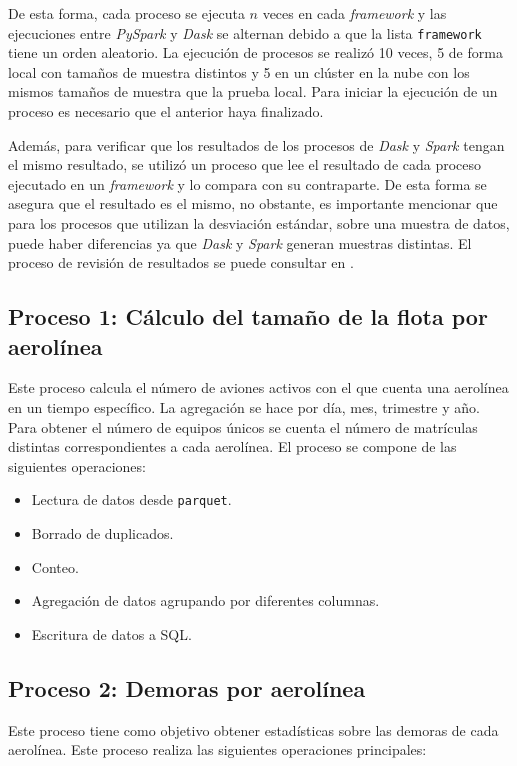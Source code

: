 De esta forma, cada proceso se ejecuta $n$ veces en cada \textit{framework} y las ejecuciones entre \textit{PySpark} y \textit{Dask} se alternan debido a que la lista \texttt{framework} tiene un orden aleatorio. La ejecución de procesos se realizó 10 veces, 5 de forma local con tamaños de muestra distintos y 5 en un clúster en la nube con los mismos tamaños de muestra que la prueba local. Para iniciar la ejecución de un proceso es necesario que el anterior haya finalizado.

Además, para verificar que los resultados de los procesos de \textit{Dask} y \textit{Spark} tengan el mismo resultado, se utilizó un proceso que lee el resultado de cada proceso ejecutado en un \textit{framework} y lo compara con su contraparte. De esta forma se asegura que el resultado es el mismo, no obstante, es importante mencionar que para los procesos que utilizan la desviación estándar, sobre una muestra de datos, puede haber diferencias ya que \textit{Dask} y \textit{Spark} generan muestras distintas. El proceso de revisión de resultados se puede consultar en \cite{compara-resultados}.

\subsection{Proceso 1: Cálculo del tamaño de la flota por aerolínea}

Este proceso calcula el número de aviones activos con el que cuenta una aerolínea en un tiempo específico. La agregación se hace por día, mes, trimestre y año. Para obtener el número de equipos únicos se cuenta el número de matrículas distintas correspondientes a cada aerolínea. El proceso se compone de las siguientes operaciones:

\begin{itemize}
	\item Lectura de datos desde \texttt{parquet}.
	\item Borrado de duplicados.
	\item Conteo.
	\item Agregación de datos agrupando por diferentes columnas.
	\item Escritura de datos a SQL.
\end{itemize}

\subsection{Proceso 2: Demoras por aerolínea}

Este proceso tiene como objetivo obtener estadísticas sobre las demoras de cada aerolínea. Este proceso realiza las siguientes operaciones principales:

